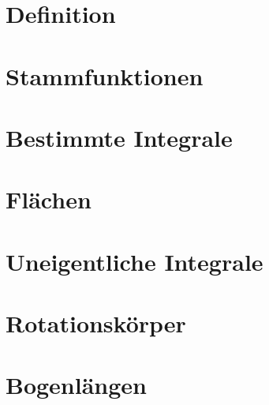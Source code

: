 \documentclass{article}
\begin{document}
\section{Definition}
\section{Stammfunktionen}
\section{Bestimmte Integrale}
\section{Flächen}
\section{Uneigentliche Integrale} 
\section{Rotationskörper}
\section{Bogenlängen} 
\end{document}
